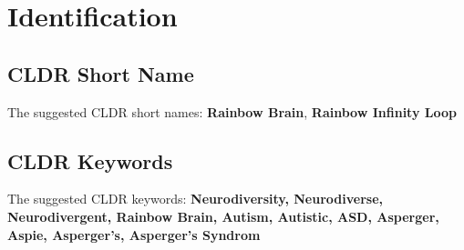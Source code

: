 \section{Identification}

\subsection{CLDR Short Name}
The suggested CLDR short names: \textbf{Rainbow Brain}, \textbf{Rainbow Infinity Loop}


\subsection{CLDR Keywords}
The suggested CLDR keywords: \textbf{Neurodiversity, Neurodiverse, Neurodivergent, Rainbow Brain, Autism, Autistic, ASD, Asperger, Aspie, Asperger's, Asperger's Syndrom}
